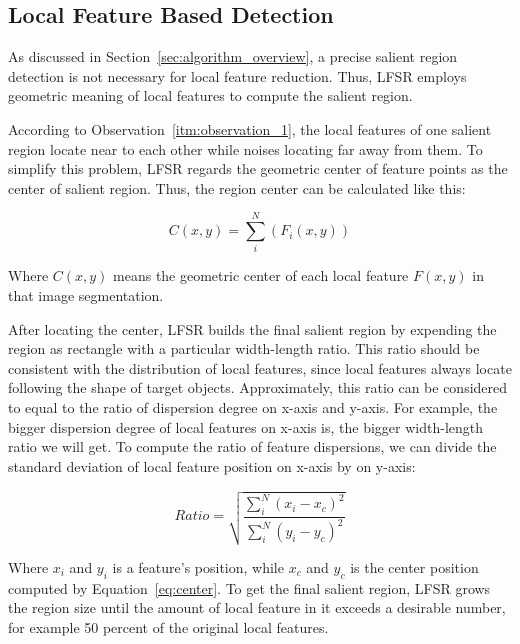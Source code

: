 \subsection{Local Feature Based Detection}
\label{sec:algorithm_detection}

As discussed in Section~\ref{sec:algorithm_overview}, a precise salient region detection is not necessary for local feature reduction. Thus, LFSR employs geometric meaning of local features to compute the salient region.

According to Observation~\ref{itm:observation_1}, the local features of one salient region locate near to each other while noises locating far away from them. To simplify this problem, LFSR regards the geometric center of feature points as the center of salient region. Thus, the region center can be calculated like this:

{\begin{equation} \label{eq:center}
C(x, y) = \sum_{i}^{N}\left({F}_{i}(x, y) \right)
\end{equation}}

Where $C(x, y)$ means the geometric center of each local feature $F(x, y)$ in that image segmentation.

After locating the center, LFSR builds the final salient region by expending the region as rectangle with a particular width-length ratio. This ratio should be consistent with the distribution of local features, since local features always locate following the shape of target objects. Approximately, this ratio can be considered to equal to the ratio of dispersion degree on x-axis and y-axis. For example, the bigger dispersion degree of local features on x-axis is, the bigger width-length ratio we will get. To compute the ratio of feature dispersions, we can divide the standard deviation of local feature position on x-axis by on y-axis:

{\begin{equation} \label{eq:ratio}
Ratio = \sqrt{\frac{\sum_{i}^{N}\left ( x_{i}-x_{c} \right )^{2}}{\sum_{i}^{N}\left ( y_{i}-y_{c} \right )^{2}}}
\end{equation}}

Where $x_{i}$ and $y_{i}$ is a feature's position, while $x_{c}$ and $y_{c}$ is the center position computed by Equation~\ref{eq:center}. To get the final salient region, LFSR grows the region size until the amount of local feature in it exceeds a desirable number, for example 50 percent of the original local features.

